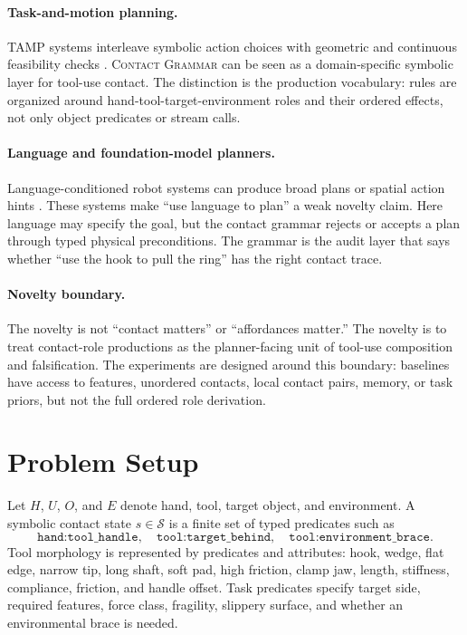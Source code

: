\documentclass{article}
\newcommand{\CG}{\textsc{Contact Grammar}}
\newcommand{\Cstate}{\mathcal{S}}
\begin{document}
\paragraph{Task-and-motion planning.}
TAMP systems interleave symbolic action choices with geometric and continuous feasibility checks \citep{kaelbling2011tamp,toussaint2015logic,garrett2020pddlstream}. \CG{} can be seen as a domain-specific symbolic layer for tool-use contact. The distinction is the production vocabulary: rules are organized around hand-tool-target-environment roles and their ordered effects, not only object predicates or stream calls.

\paragraph{Language and foundation-model planners.}
Language-conditioned robot systems can produce broad plans or spatial action hints \citep{ahn2022saycan,brohan2022rt1,brohan2023rt2,liang2023code,huang2023voxposer,wi2023calamari}. These systems make ``use language to plan'' a weak novelty claim. Here language may specify the goal, but the contact grammar rejects or accepts a plan through typed physical preconditions. The grammar is the audit layer that says whether ``use the hook to pull the ring'' has the right contact trace.

\paragraph{Novelty boundary.}
The novelty is not ``contact matters'' or ``affordances matter.'' The novelty is to treat contact-role productions as the planner-facing unit of tool-use composition and falsification. The experiments are designed around this boundary: baselines have access to features, unordered contacts, local contact pairs, memory, or task priors, but not the full ordered role derivation.

\section{Problem Setup}

Let $H$, $U$, $O$, and $E$ denote hand, tool, target object, and environment. A symbolic contact state $s\in\Cstate$ is a finite set of typed predicates such as
\[
    \texttt{hand:tool\_handle},\quad
    \texttt{tool:target\_behind},\quad
    \texttt{tool:environment\_brace}.
\]
Tool morphology is represented by predicates and attributes: hook, wedge, flat edge, narrow tip, long shaft, soft pad, high friction, clamp jaw, length, stiffness, compliance, friction, and handle offset. Task predicates specify target side, required features, force class, fragility, slippery surface, and whether an environmental brace is needed.
\end{document}
